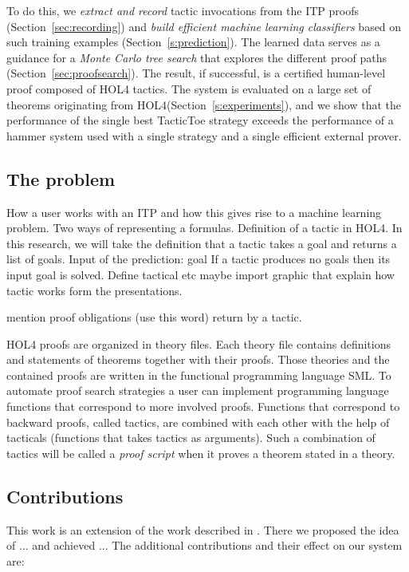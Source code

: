 \documentclass[runningheads,a4paper,draft]{svjour3}
\newcommand{\todoi}[1]{\todo[inline]{#1}}
\def\holfour{\textsf{HOL4}\xspace}
\def\sml{\textsf{SML}\xspace}
\def\tactictoe{\textsf{TacticToe}\xspace}
\begin{document}
\todoi{Rewrite the plan}
  To do this, we \emph{extract and record} tactic invocations from the ITP
  proofs (Section~\ref{sec:recording}) and
  \emph{build efficient machine learning classifiers} based on such training
  examples (Section~\ref{s:prediction}).  The learned data serves as a
  guidance for a \emph{Monte Carlo tree search} that explores the different
  proof paths (Section~\ref{sec:proofsearch}). The result, if
  successful, is a certified human-level proof composed of \holfour
  tactics.  The system is evaluated on a large set of theorems originating
  from \holfour (Section~\ref{s:experiments}), and we show that the performance
  of the single best \tactictoe strategy exceeds the performance of a hammer
  system used with a single strategy and a single efficient external prover.


\subsection{The problem}
How a user works with an ITP and how this gives rise to a machine learning
problem.
Two ways of representing a formulas.
Definition of a tactic in \holfour. In this research, we will take the definition
that a tactic takes a goal and returns a list of goals.
Input of the prediction: goal
If a tactic produces no goals then its input goal is solved.
Define tactical etc maybe import graphic that explain how tactic works form the
presentations.

mention proof obligations (use this word) return by a tactic.

\holfour proofs are organized in theory files.
Each theory file contains definitions and statements of theorems together with
their proofs. Those theories and the contained proofs
are written
in the functional programming language \sml. To automate
proof search strategies a user can implement programming language functions
that correspond to more involved proofs.
Functions that correspond to backward proofs, called tactics, are combined with
each other with the help of
tacticals (functions that takes
tactics as arguments). Such a combination of tactics will be called a
\emph{proof script} when it
proves a theorem stated in a theory.

\subsection{Contributions}
This work is an extension of the work described in \cite{tgckju-lpar17}.
There we proposed the idea of ... and achieved ...
The additional contributions and their effect on our system are:
\end{document}
